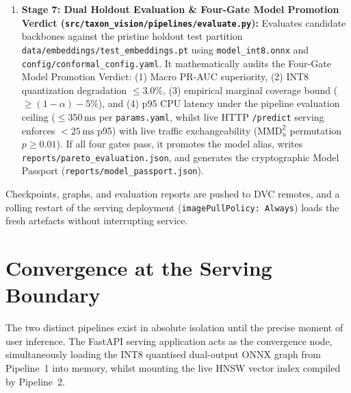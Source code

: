 \begin{enumerate}
    \item \textbf{Stage 7: Dual Holdout Evaluation \& Four-Gate Model Promotion Verdict (\texttt{src/taxon\_vision/pipelines/evaluate.py}):} Evaluates candidate backbones against the pristine holdout test partition \nolinkurl{data/embeddings/test_embeddings.pt} using \nolinkurl{model_int8.onnx} and \nolinkurl{config/conformal_config.yaml}. It mathematically audits the Four-Gate Model Promotion Verdict: (1) Macro PR-AUC superiority, (2) INT8 quantization degradation $\le 3.0\%$, (3) empirical marginal coverage bound ($\ge (1 - \alpha) - 5\%$), and (4) p95 CPU latency under the pipeline evaluation ceiling ($\le 350\,\text{ms}$ per \nolinkurl{params.yaml}, whilst live HTTP \texttt{/predict} serving enforces $< 25\,\text{ms}$ p95) with live traffic exchangeability ($\text{MMD}_u^2$ permutation $p \ge 0.01$). If all four gates pass, it promotes the model alias, writes \nolinkurl{reports/pareto_evaluation.json}, and generates the cryptographic Model Passport (\nolinkurl{reports/model_passport.json}).
\end{enumerate}
Checkpoints, graphs, and evaluation reports are pushed to DVC remotes, and a rolling restart of the serving deployment (\texttt{imagePullPolicy: Always}) loads the fresh artefacts without interrupting service.

\section{Convergence at the Serving Boundary}
\label{sec:serving_convergence}

The two distinct pipelines exist in absolute isolation until the precise moment of user inference. The FastAPI serving application acts as the convergence node, simultaneously loading the INT8 quantised dual-output ONNX graph from Pipeline~1 into memory, whilst mounting the live HNSW vector index compiled by Pipeline~2.

